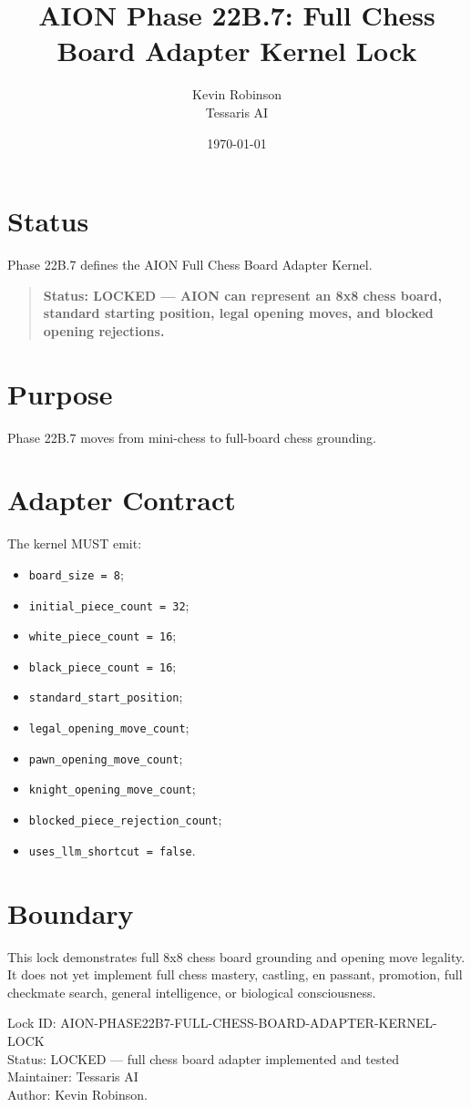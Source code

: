 \documentclass[11pt,a4paper]{article}
\title{\textbf{AION Phase 22B.7: Full Chess Board Adapter Kernel Lock}}
\author{Kevin Robinson\\Tessaris AI}
\date{\today}
\begin{document}
\maketitle

\section{Status}

Phase 22B.7 defines the AION Full Chess Board Adapter Kernel.

\begin{quote}
\textbf{Status: LOCKED --- AION can represent an 8x8 chess board, standard starting position, legal opening moves, and blocked opening rejections.}
\end{quote}

\section{Purpose}

Phase 22B.7 moves from mini-chess to full-board chess grounding.

\section{Adapter Contract}

The kernel MUST emit:

\begin{itemize}
  \item \texttt{board\_size = 8};
  \item \texttt{initial\_piece\_count = 32};
  \item \texttt{white\_piece\_count = 16};
  \item \texttt{black\_piece\_count = 16};
  \item \texttt{standard\_start\_position};
  \item \texttt{legal\_opening\_move\_count};
  \item \texttt{pawn\_opening\_move\_count};
  \item \texttt{knight\_opening\_move\_count};
  \item \texttt{blocked\_piece\_rejection\_count};
  \item \texttt{uses\_llm\_shortcut = false}.
\end{itemize}

\section{Boundary}

This lock demonstrates full 8x8 chess board grounding and opening move legality. It does not yet implement full chess mastery, castling, en passant, promotion, full checkmate search, general intelligence, or biological consciousness.

\bigskip

\noindent
Lock ID: AION-PHASE22B7-FULL-CHESS-BOARD-ADAPTER-KERNEL-LOCK\\
Status: LOCKED --- full chess board adapter implemented and tested\\
Maintainer: Tessaris AI\\
Author: Kevin Robinson.
\end{document}

